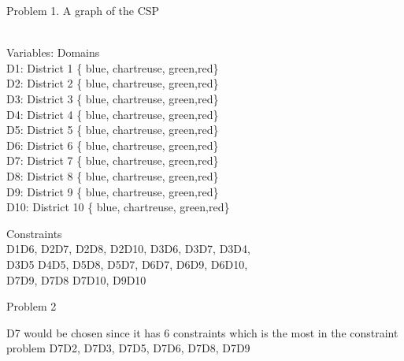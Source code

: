 \documentclass{article}
\begin{document}
Problem 1.
A graph of the CSP 
\vspace{10mm}

\\
Variables:      Domains\\
D1: District 1 \left\{ {blue, chartreuse, green,red}\right\} \\
D2: District 2 \left\{ {blue, chartreuse, green,red}\right\} \\
D3: District 3 \left\{ {blue, chartreuse, green,red}\right\} \\
D4: District 4 \left\{ {blue, chartreuse, green,red}\right\} \\
D5: District 5 \left\{ {blue, chartreuse, green,red}\right\} \\
D6: District 6 \left\{ {blue, chartreuse, green,red}\right\} \\
D7: District 7 \left\{ {blue, chartreuse, green,red}\right\} \\
D8: District 8 \left\{ {blue, chartreuse, green,red}\right\} \\
D9: District 9 \left\{ {blue, chartreuse, green,red}\right\} \\
D10: District 10 \left\{ {blue, chartreuse, green,red}\right\} \\

\begin{constraints}
Constraints\\
D1\ne D6, D2\ne D7, D2\ne D8, D2\ne D10, D3\ne D6, D3\ne D7, D3\ne D4, \\ D3\ne D5
D4\ne D5, D5\ne D8, D5\ne D7, D6\ne D7, D6\ne D9, D6\ne D10, \\ D7\ne D9, D7\ne D8
D7\ne D10, D9\ne D10 \\
\end{constraints}
\vspace{3mm}

Problem 2
\begin{Problem}

D7 would be chosen since it has 6 constraints which is the most in the constraint problem
D7\ne D2, D7\ne D3, D7\ne D5, D7\ne D6, D7\ne D8, D7\ne D9
\end{Problem}
\vspace{3mm}
\end{document}
